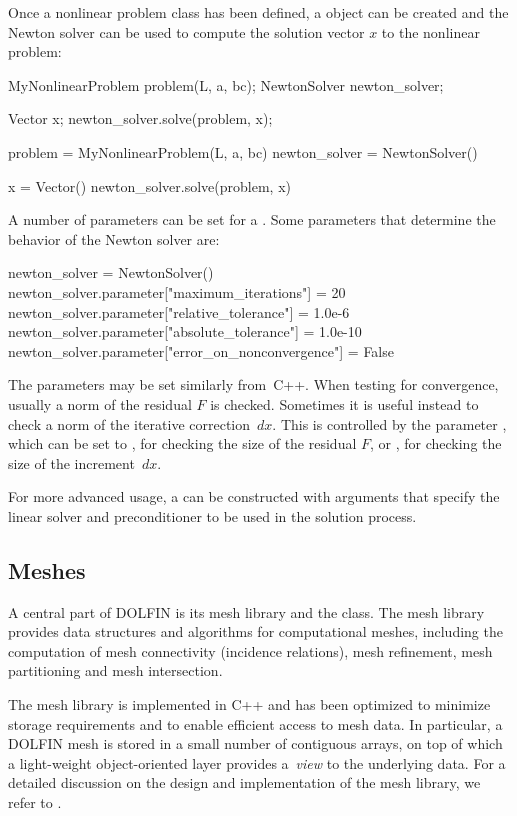 Once a nonlinear problem class has been defined, a 
object can be created and the Newton solver can be used to compute
the solution vector $x$ to the nonlinear problem:
\begin{c++}
MyNonlinearProblem problem(L, a, bc);
NewtonSolver newton_solver;

Vector x;
newton_solver.solve(problem, x);
\end{c++}
\begin{python}
problem = MyNonlinearProblem(L, a, bc)
newton_solver = NewtonSolver()

x = Vector()
newton_solver.solve(problem, x)
\end{python}
A number of parameters can be set for a . Some
parameters that determine the behavior of the Newton solver are:
\begin{python}
newton_solver = NewtonSolver()
newton_solver.parameter["maximum_iterations"] = 20
newton_solver.parameter["relative_tolerance"] = 1.0e-6
newton_solver.parameter["absolute_tolerance"] = 1.0e-10
newton_solver.parameter["error_on_nonconvergence"] = False
\end{python}
The parameters may be set similarly from~C++.  When testing for
convergence, usually a norm of the residual $F$ is checked.  Sometimes it
is useful instead to check a norm of the iterative correction~$dx$.
This is controlled by the parameter , which
can be set to , for checking the size of the residual $F$,
or , for checking the size of the increment~$dx$.

For more advanced usage, a  can be constructed with
arguments that specify the linear solver and preconditioner to be used
in the solution process.

\subsection{Meshes}

A central part of DOLFIN is its mesh library and the 
class. The mesh library provides data structures and algorithms for
computational meshes, including the computation of mesh connectivity
(incidence relations), mesh refinement, mesh partitioning and mesh
intersection.

The mesh library is implemented in C++ and has been optimized to
minimize storage requirements and to enable efficient access to mesh
data. In particular, a DOLFIN mesh is stored in a small number of
contiguous arrays, on top of which a light-weight object-oriented
layer provides a~\emph{view} to the underlying data. For a detailed
discussion on the design and implementation of the mesh library, we
refer to \citet{Logg2009}.

